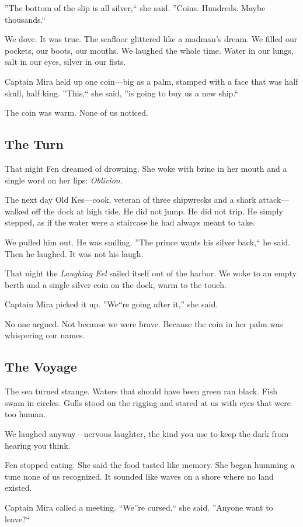 \documentclass[12pt]{article}
\begin{document}
''The bottom of the slip is all silver,`` she said. ''Coins. Hundreds. Maybe thousands.``

We dove. It was true. The seafloor glittered like a madman's dream. We filled our pockets, our boots, our mouths. We laughed the whole time. Water in our lungs, salt in our eyes, silver in our fists.

Captain Mira held up one coin---big as a palm, stamped with a face that was half skull, half king. ''This,`` she said, ''is going to buy us a new ship.``

The coin was warm. None of us noticed.

\subsection*{The Turn}
That night Fen dreamed of drowning. She woke with brine in her mouth and a single word on her lips: \textit{Oblivion}.

The next day Old Kes---cook, veteran of three shipwrecks and a shark attack---walked off the dock at high tide. He did not jump. He did not trip. He simply stepped, as if the water were a staircase he had always meant to take.

We pulled him out. He was smiling. ''The prince wants his silver back,`` he said. Then he laughed. It was not his laugh.

That night the \textit{Laughing Eel} sailed itself out of the harbor. We woke to an empty berth and a single silver coin on the dock, warm to the touch.

Captain Mira picked it up. ''We``re going after it,'' she said.

No one argued. Not because we were brave. Because the coin in her palm was whispering our names.

\subsection*{The Voyage}
The sea turned strange. Waters that should have been green ran black. Fish swam in circles. Gulls stood on the rigging and stared at us with eyes that were too human.

We laughed anyway---nervous laughter, the kind you use to keep the dark from hearing you think.

Fen stopped eating. She said the food tasted like memory. She began humming a tune none of us recognized. It sounded like waves on a shore where no land existed.

Captain Mira called a meeting. ``We''re cursed,`` she said. ''Anyone want to leave?``
\end{document}
